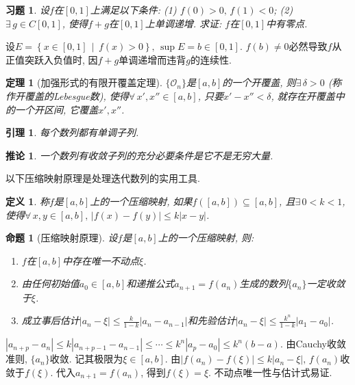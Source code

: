 \documentclass[11pt,a4paper]{ctexart}
\makeatletter
\theoremstyle{thmseries} %
\newtheorem{thm}{定理}[section]
\newtheorem{cor}{推论}[section]
\newtheorem{prop}{命题}[section]
\newtheorem{lem}{引理}[section]
\theoremstyle{exerseries}
\newtheorem{defn}{定义}[section]
\newtheorem{exer}{习题}[section]
\newtheorem*{rem}{注}
\renewenvironment{proof}[1][\proofname]{\par
  \pushQED{\qed}%
  \normalfont \topsep6\p@\@plus6\p@\relax
  \trivlist
  \item[\hskip\labelsep
        \itshape
    #1\@addpunct{}]\ignorespaces
}{%
  \popQED\endtrivlist\@endpefalse
}
\newenvironment{pf}{\begin{proof}[\bfseries\upshape 证\quad]}{\end{proof}}
\newcommand{\bra}[1]{\mathopen{}\left(#1\right)}
\newcommand{\cbra}[1]{\mathopen{}\left\{#1\right\}}
\makeatother
\begin{document}
\begin{exer}
	设$f$在$[0,1]$上满足以下条件: (1) $f(0)>0,\,f(1)<0$; (2) $\exists\,g\in C[0,1]$, 使得$f+g$在$[0,1]$上单调递增. 求证: $f$在$[0,1]$中有零点. 
\end{exer}
\begin{pf}
	设$E=\cbra{x\in[0,1]\,\middle\vert\,f(x)>0},\,\sup E=b\in[0,1]$. $f(b)\neq0$必然导致$f$从正值突跃入负值时, 因$f+g$单调递增而违背$g$的连续性. 
\end{pf}

\begin{thm}[加强形式的有限开覆盖定理]
	$\{\mathcal{O}_n\}$是$[a,b]$的一个开覆盖, 则$\exists\,\delta>0$ (称作开覆盖的Lebesgue数), 使得$\forall\,x',x''\in[a,b]$, 只要$x'-x''<\delta$, 就存在开覆盖中的一个开区间, 它覆盖$x',x''$. 
\end{thm}


\begin{lem}
	每个数列都有单调子列. 
\end{lem}

\begin{cor}
	一个数列有收敛子列的充分必要条件是它不是无穷大量. 
\end{cor}

以下压缩映射原理是处理迭代数列的实用工具. 
\begin{defn}
	称$f$是$[a,b]$上的一个压缩映射, 如果$f\bra{[a,b]}\subseteq[a,b]$, 且$\exists\,0<k<1$, 使得$\forall\,x,y\in[a,b],\,|f(x)-f(y)|\leq k|x-y|$. 
\end{defn}

\begin{prop}[压缩映射原理]
	设$f$是$[a,b]$上的一个压缩映射, 则:
	\begin{enumerate}
		\item $f$在$[a,b]$中存在唯一不动点$\xi$. 
		\item 由任何初始值$a_0\in[a,b]$和递推公式$a_{n+1}=f(a_n)$生成的数列$\{a_n\}$一定收敛于$\xi$. 
		\item 成立事后估计$|a_n-\xi|\leq\frac{k}{1-k}|a_n-a_{n-1}|$和先验估计$|a_n-\xi|\leq\frac{k^n}{1-k}|a_1-a_0|$. 
	\end{enumerate}
\end{prop}
\begin{pf}
	$|a_{n+p}-a_n|\leq k|a_{n+p-1}-a_{n-1}|\leq\cdots\leq k^n|a_p-a_0|\leq k^n(b-a)$. 由Cauchy收敛准则, $\{a_n\}$收敛. 记其极限为$\xi\in[a,b]$. 由$|f(a_n)-f(\xi)|\leq k|a_n-\xi|,\,f(a_n)$收敛于$f(\xi)$. 代入$a_{n+1}=f(a_n)$, 得到$f(\xi)=\xi$. 不动点唯一性与估计式易证. 
\end{pf}
\end{document}
